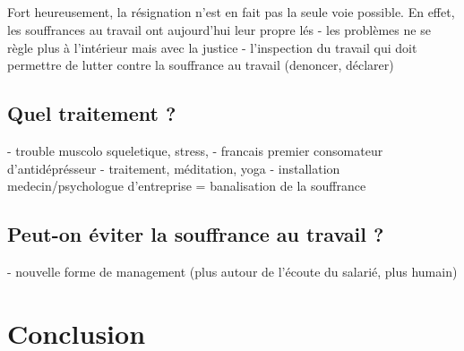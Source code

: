 \documentclass{report}
\begin{document}
		\paragraph{}
			Fort heureusement, la résignation n'est en fait pas la seule voie possible. En effet, les souffrances au travail ont aujourd'hui leur propre lés
		- les problèmes ne se règle plus à l'intérieur mais avec la justice
		- l'inspection du travail qui doit permettre de lutter contre la souffrance au travail (denoncer, déclarer)
	\section{Quel traitement ?}
		- trouble muscolo squeletique, stress, 
		- francais premier consomateur d'antidéprésseur
		- traitement, méditation, yoga
		- installation medecin/psychologue d'entreprise = banalisation de la souffrance
	\section{Peut-on éviter la souffrance au travail ?}
    	- nouvelle forme de management (plus autour de l'écoute du salarié, plus humain)
\chapter*{Conclusion}
    \paragraph*{}
         
\end{document}
